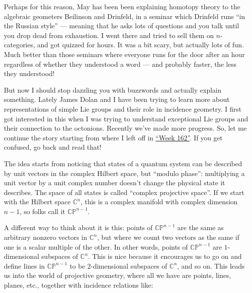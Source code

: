 \documentclass{article}
\def\tightlist{}
\renewcommand{\texttt}[1]{%
  \begingroup
  \ttfamily
  \begingroup\lccode`~=`/\lowercase{\endgroup\def~}{/\discretionary{}{}{}}%
  \begingroup\lccode`~=`[\lowercase{\endgroup\def~}{[\discretionary{}{}{}}%
  \begingroup\lccode`~=`.\lowercase{\endgroup\def~}{.\discretionary{}{}{}}%
  \catcode`/=\active\catcode`[=\active\catcode`.=\active
  \scantokens{#1\noexpand}%
  \endgroup
}
\begin{document}

Perhaps for this reason, May has been been explaining homotopy theory to
the algebraic geometers Beilinson and Drinfeld, in a seminar which
Drinfeld runs ``in the Russian style'' --- meaning that he asks lots of
questions and you talk until you drop dead from exhaustion. I went there
and tried to sell them on \(n\)-categories, and got quizzed for hours.
It was a bit scary, but actually lots of fun. Much better than those
seminars where everyone runs for the door after an hour regardless of
whether they understood a word --- and probably faster, the less they
understood!

But now I should stop dazzling you with buzzwords and actually explain
something. Lately James Dolan and I have been trying to learn more about
representations of simple Lie groups and their role in incidence
geometry. I first got interested in this when I was trying to understand
exceptional Lie groups and their connection to the octonions. Recently
we've made more progress. So, let me continue the story starting from
where I left off in \protect\hyperlink{week162}{``Week 162''}. If you
get confused, go back and read that!

The idea starts from noticing that states of a quantum system can be
described by unit vectors in the complex Hilbert space, but ``modulo
phase'': multiplying a unit vector by a unit complex number doesn't
change the physical state it describes. The space of all states is
called ``complex projective space''. If we start with the Hilbert space
\(\mathbb{C}^n\), this is a complex manifold with complex dimension
\(n-1\), so folks call it \(\mathbb{CP}^{n-1}\).

A different way to think about it is this: points of
\(\mathbb{CP}^{n-1}\) are the same as arbitrary nonzero vectors in
\(\mathbb{C}^n\), but where we count two vectors as the same if one is a
scalar multiple of the other. In other words, points of
\(\mathbb{CP}^{n-1}\) are \(1\)-dimensional subspaces of
\(\mathbb{C}^n\). This is nice because it encourages us to go on and
define lines in \(\mathbb{CP}^{n-1}\) to be \(2\)-dimensional subspaces
of \(\mathbb{C}^n\), and so on. This leads us into the world of
projective geometry, where all we have are points, lines, planes, etc.,
together with incidence relations like:
\end{document}
